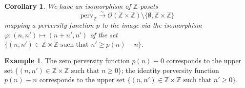 \documentclass{article}
\newtheorem{cor}[thm]{Corollary}
\theoremstyle{definition}
\newtheorem{exmp}[thm]{Example}
\newcommand{\Z}{\mathbb{Z}}
\newcommand{\Oo}{\mathcal{O}}
\begin{document}
\begin{cor}\label{corperv}
We have an isomorphism of $\Z$-posets
\[
\mathrm{perv}_\Z\xrightarrow{\sim} \Oo(\Z\times \Z)\setminus\{\emptyset,\Z\times\Z\}
\]
mapping a perversity function $p$ to the image via the isomorphism $\varphi\colon (n,n')\mapsto (n+n',n')$ of the set $\{(n,n')\in \Z\times \Z\text{ such that } n'\geq p(n)-n\}$.
\end{cor}

\begin{exmp}
The zero perversity function $p(n)\equiv 0$ corresponds to the upper set $\{(n,n')\in \Z\times \Z\text{ such that } n\geq 0\}$; the identity perversity function $p(n)\equiv n$ corresponds to the upper set $\{(n,n')\in \Z\times \Z\text{ such that } n'\geq 0\}$.
\end{exmp}
\end{document}

